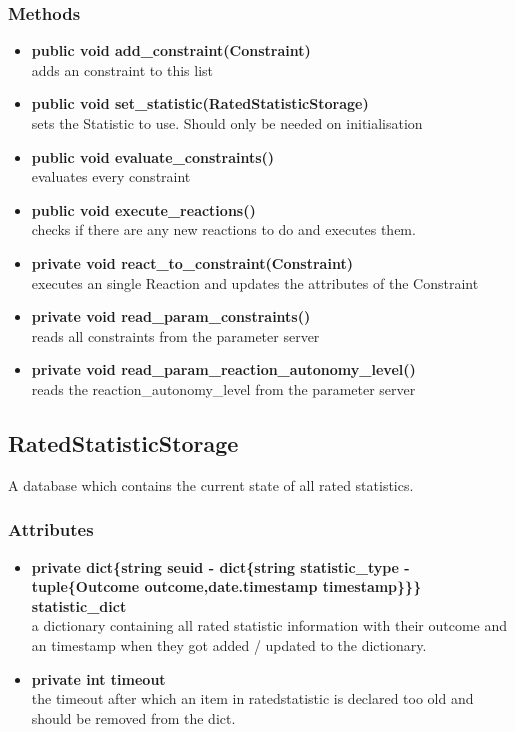 \subsubsection{Methods}
\begin{itemize}
	\item \textbf{ public void add\_constraint(Constraint)  }\\
		adds an constraint to this list
	\item \textbf{ public void set\_statistic(RatedStatisticStorage)  }\\
		sets the Statistic to use. Should only be needed on initialisation
	\item \textbf{ public void evaluate\_constraints()  }\\
		evaluates every constraint
	\item \textbf{ public void execute\_reactions()  }\\
		checks if there are any new reactions to do and executes them.
	\item \textbf{ private void react\_to\_constraint(Constraint)  }\\
		executes an single Reaction and updates the attributes of the Constraint
	\item \textbf{ private void read\_param\_constraints()  }\\
		reads all constraints from the parameter server
	\item \textbf{ private void read\_param\_reaction\_autonomy\_level()  }\\
		reads the reaction\_autonomy\_level from the parameter server
\end{itemize}


\subsection{RatedStatisticStorage}
A database which contains the current state of all rated statistics.
\subsubsection{Attributes}
\begin{itemize}
	\item \textbf{ private dict\{string seuid - dict\{string statistic\_type - tuple\{Outcome outcome,date.timestamp timestamp\}\}\} statistic\_dict }\\
		a dictionary containing all rated statistic information with their outcome and an timestamp when they got added / updated to the dictionary.
	\item \textbf{ private int timeout }\\
		the timeout after which an item in ratedstatistic is declared too old and should be removed from the dict.
\end{itemize}
